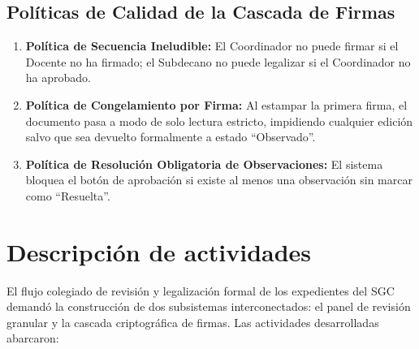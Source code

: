 \documentclass[12pt,a4paper]{article}
\begin{document}
\subsection{Políticas de Calidad de la Cascada de Firmas}
\begin{enumerate}[leftmargin=1.5em, itemsep=2pt]
    \item \textbf{Política de Secuencia Ineludible:} El Coordinador no puede firmar si el Docente no ha firmado; el Subdecano no puede legalizar si el Coordinador no ha aprobado.
    \item \textbf{Política de Congelamiento por Firma:} Al estampar la primera firma, el documento pasa a modo de solo lectura estricto, impidiendo cualquier edición salvo que sea devuelto formalmente a estado ``Observado''.
    \item \textbf{Política de Resolución Obligatoria de Observaciones:} El sistema bloquea el botón de aprobación si existe al menos una observación sin marcar como ``Resuelta''.
\end{enumerate}

\section{Descripción de actividades}
El flujo colegiado de revisión y legalización formal de los expedientes del SGC demandó la construcción de dos subsistemas interconectados: el panel de revisión granular y la cascada criptográfica de firmas. Las actividades desarrolladas abarcaron:
\end{document}
